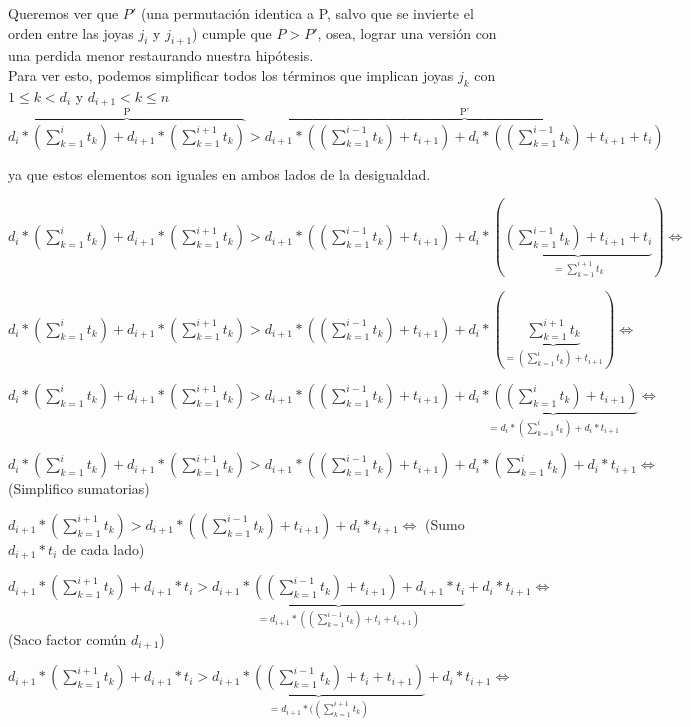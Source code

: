 Queremos ver que $P'$ (una permutaci\'on identica a P, salvo que se invierte el orden entre las joyas $j_i$ y $j_{i+1}$) cumple que $P > P'$, osea, lograr una versi\'on con una perdida menor restaurando nuestra hip\'otesis. \\

Para ver esto, podemos simplificar todos los t\'erminos que implican joyas $j_k$ con $1 \leq k < d_i$ y $d_{i+1} < k \leq n $ \\

$\overbrace{d_i*(\sum\limits_{k=1}^i t_k) + d_{i+1}*(\sum\limits_{k=1}^{i+1} t_k)}^{\text{P}} > \overbrace{d_{i+1}*((\sum\limits_{k=1}^{i-1} t_k) + t_{i+1}) + d_i*((\sum\limits_{k=1}^{i-1} t_k) + t_{i+1} + t_i)}^{\text{P'}}$

ya que estos elementos son iguales en ambos lados de la desigualdad.

$d_i*(\sum\limits_{k=1}^i t_k) + d_{i+1}*(\sum\limits_{k=1}^{i+1} t_k) > d_{i+1}*((\sum\limits_{k=1}^{i-1} t_k) + t_{i+1}) + d_i*(\underbrace{(\sum\limits_{k=1}^{i-1} t_k) + t_{i+1} + t_i}_{= \sum\limits_{k=1}^{i+1} t_k}) \Longleftrightarrow$

$d_i*(\sum\limits_{k=1}^i t_k) + d_{i+1}*(\sum\limits_{k=1}^{i+1} t_k) > d_{i+1}*((\sum\limits_{k=1}^{i-1} t_k) + t_{i+1}) + d_i*(\underbrace{\sum\limits_{k=1}^{i+1} t_k}_{= (\sum\limits_{k=1}^{i} t_k) + t_{i+1}}) \Longleftrightarrow$

$d_i*(\sum\limits_{k=1}^i t_k) + d_{i+1}*(\sum\limits_{k=1}^{i+1} t_k) > d_{i+1}*((\sum\limits_{k=1}^{i-1} t_k) + t_{i+1}) + \underbrace{d_i*((\sum\limits_{k=1}^{i} t_k) + t_{i+1})}_{= d_i*(\sum\limits_{k=1}^{i} t_k) + d_i*t_{i+1}} \Longleftrightarrow$

$d_i*(\sum\limits_{k=1}^i t_k) + d_{i+1}*(\sum\limits_{k=1}^{i+1} t_k) > d_{i+1}*((\sum\limits_{k=1}^{i-1} t_k) + t_{i+1}) + d_i*(\sum\limits_{k=1}^{i} t_k) + d_i*t_{i+1} \Longleftrightarrow$ (Simplifico sumatorias)

$d_{i+1}*(\sum\limits_{k=1}^{i+1} t_k) > d_{i+1}*((\sum\limits_{k=1}^{i-1} t_k) + t_{i+1}) + d_i*t_{i+1} \Longleftrightarrow$ (Sumo $d_{i+1}*t_i$ de cada lado)

$d_{i+1}*(\sum\limits_{k=1}^{i+1} t_k) + d_{i+1}*t_i > \underbrace{d_{i+1}*((\sum\limits_{k=1}^{i-1} t_k) + t_{i+1}) + d_{i+1}*t_i}_{= d_{i+1}*((\sum\limits_{k=1}^{i-1} t_k) + t_{i} + t_{i+1})} + d_i*t_{i+1} \Longleftrightarrow$ (Saco factor com\'un $d_{i+1}$)

$d_{i+1}*(\sum\limits_{k=1}^{i+1} t_k) + d_{i+1}*t_i > \underbrace{d_{i+1}*((\sum\limits_{k=1}^{i-1} t_k) + t_{i} + t_{i+1})}_{= d_{i+1}*((\sum\limits_{k=1}^{i+1} t_k)} + d_i*t_{i+1} \Longleftrightarrow$

